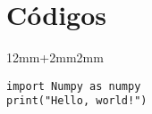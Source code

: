 \newpage
\section{Códigos}
{
\renewcommand\ttdefault{cmtt}
\begin{adjustwidth}{12mm+2mm}{2mm}
\begin{lstlisting}
import Numpy as numpy
print("Hello, world!")
\end{lstlisting}
\end{adjustwidth}
}
